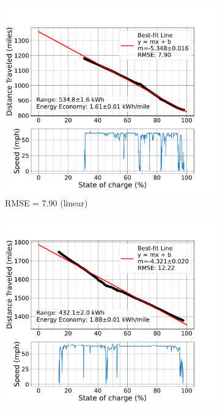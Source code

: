 \begin{figure}[H]
    \centering
    \begin{subfigure}[b]{0.48\textwidth}
        \centering
        \includegraphics[width=\textwidth]{figures/pepsi_1_battery_soc_vs_distance_event_13_linearfit.pdf}
        \caption{RMSE = 7.90 (linear)}
        \label{fig:distance_vs_soc_below_cutoff}
    \end{subfigure}
    \hfill
    \begin{subfigure}[b]{0.48\textwidth}
        \centering
        \includegraphics[width=\textwidth]{figures/pepsi_3_battery_soc_vs_distance_event_11_linearfit.pdf}

\end{subfigure}
\end{figure}
